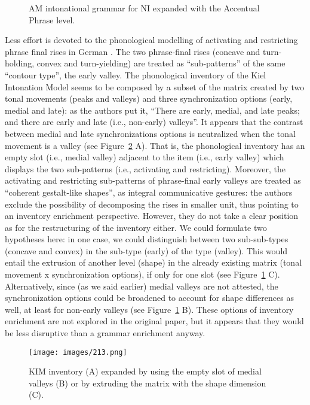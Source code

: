 \begin{figure}
\centering
{}
\caption{AM intonational grammar for NI expanded with the Accentual Phrase level.}
\label{fig212}\end{figure}

Less effort is devoted to the phonological modelling of activating and restricting phrase final rises in German \citep{dombrowski2005acoustic}. The two phrase-final rises (concave and turn-holding, convex and turn-yielding) are treated as ``sub-patterns'' of the same ``contour type'', the early valley. The phonological inventory of the Kiel Intonation Model seems to be composed by a subset of the matrix created by two tonal movements (peaks and valleys) and three synchronization options (early, medial and late): as the authors put it, ``There are early, medial, and late peaks; and there are early and late (i.e., non-early) valleys''. It appears that the contrast between medial and late synchronizations options is neutralized when the tonal movement is a valley (see Figure~\ref{fig213} A). That is, the phonological inventory has an empty slot (i.e., medial valley) adjacent to the item (i.e., early valley) which displays the two sub-patterns (i.e., activating and restricting). Moreover, the activating and restricting sub-patterns of phrase-final early valleys are treated as ``coherent gestalt-like shapes'', as integral communicative gestures: the authors exclude the possibility of decomposing the rises in smaller unit, thus pointing to an inventory enrichment perspective. However, they do not take a clear position as for the restructuring of the inventory either. We could formulate two hypotheses here: in one case, we could distinguish between two sub-sub-types (concave and convex) in the sub-type (early) of the type (valley). This would entail the extrusion of another level (shape) in the already existing matrix (tonal movement x synchronization options), if only for one slot (see Figure~\ref{fig212} C). Alternatively, since (as we said earlier) medial valleys are not attested, the synchronization options could be broadened to account for shape differences as well, at least for non-early valleys (see Figure~\ref{fig212} B). These options of inventory enrichment are not explored in the original paper, but it appears that they would be less disruptive than a grammar enrichment anyway.

\begin{figure}
\centering
\texttt{[image: images/213.png]}
\caption{KIM inventory (A) expanded by using the empty slot of medial valleys (B) or by extruding the matrix with the shape dimension (C).}
\label{fig213}\end{figure}

